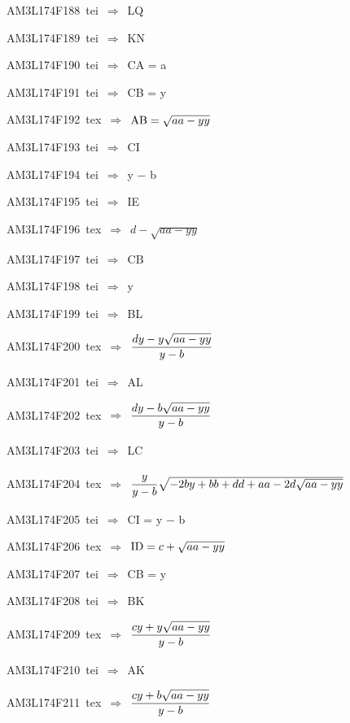 {\sixrm AM3L174F188\ {\sixit tei}\ }$\Rightarrow$\ LQ\par\smallskip
{\sixrm AM3L174F189\ {\sixit tei}\ }$\Rightarrow$\ KN\par\smallskip
{\sixrm AM3L174F190\ {\sixit tei}\ }$\Rightarrow$\ CA = {\tenit a}\par\smallskip
{\sixrm AM3L174F191\ {\sixit tei}\ }$\Rightarrow$\ CB = {\tenit y}\par\smallskip
{\sixrm AM3L174F192\ {\sixit tex}\ }$\Rightarrow$\ ${\rm AB} = \sqrt{aa - yy}$\par\smallskip
{\sixrm AM3L174F193\ {\sixit tei}\ }$\Rightarrow$\ CI\par\smallskip
{\sixrm AM3L174F194\ {\sixit tei}\ }$\Rightarrow$\ {\tenit y} − {\tenit b}\par\smallskip
{\sixrm AM3L174F195\ {\sixit tei}\ }$\Rightarrow$\ IE\par\smallskip
{\sixrm AM3L174F196\ {\sixit tex}\ }$\Rightarrow$\ $d - \sqrt{aa - yy}$\par\smallskip
{\sixrm AM3L174F197\ {\sixit tei}\ }$\Rightarrow$\ CB\par\smallskip
{\sixrm AM3L174F198\ {\sixit tei}\ }$\Rightarrow$\ {\tenit y}\par\smallskip
{\sixrm AM3L174F199\ {\sixit tei}\ }$\Rightarrow$\ BL\par\smallskip
{\sixrm AM3L174F200\ {\sixit tex}\ }$\Rightarrow$\ ${\displaystyle\strut {dy - y\sqrt{aa - yy}}\over \displaystyle\strut {y - b}}$\par\smallskip
{\sixrm AM3L174F201\ {\sixit tei}\ }$\Rightarrow$\ AL\par\smallskip
{\sixrm AM3L174F202\ {\sixit tex}\ }$\Rightarrow$\ ${\displaystyle\strut {dy - b\sqrt{aa - yy}}\over \displaystyle\strut {y - b}}$\par\smallskip
{\sixrm AM3L174F203\ {\sixit tei}\ }$\Rightarrow$\ LC\par\smallskip
{\sixrm AM3L174F204\ {\sixit tex}\ }$\Rightarrow$\ ${\displaystyle\strut {y}\over \displaystyle\strut {y - b}}\sqrt{ - 2by + bb + dd + aa - 2d\sqrt{aa - yy}}$\par\smallskip
{\sixrm AM3L174F205\ {\sixit tei}\ }$\Rightarrow$\ CI = {\tenit y} − {\tenit b}\par\smallskip
{\sixrm AM3L174F206\ {\sixit tex}\ }$\Rightarrow$\ ${\rm ID} = c + \sqrt{aa - yy}$\par\smallskip
{\sixrm AM3L174F207\ {\sixit tei}\ }$\Rightarrow$\ CB = {\tenit y}\par\smallskip
{\sixrm AM3L174F208\ {\sixit tei}\ }$\Rightarrow$\ BK\par\smallskip
{\sixrm AM3L174F209\ {\sixit tex}\ }$\Rightarrow$\ ${\displaystyle\strut {cy + y\sqrt{aa - yy}}\over \displaystyle\strut {y - b}}$\par\smallskip
{\sixrm AM3L174F210\ {\sixit tei}\ }$\Rightarrow$\ AK\par\smallskip
{\sixrm AM3L174F211\ {\sixit tex}\ }$\Rightarrow$\ ${\displaystyle\strut {cy + b\sqrt{aa - yy}}\over \displaystyle\strut {y - b}}$\par\smallskip

